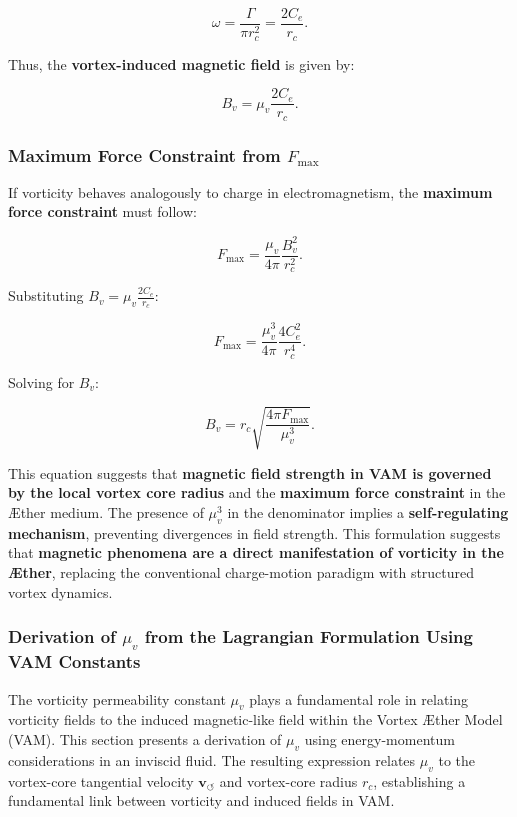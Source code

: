     \begin{equation*}
        \omega = \frac{\Gamma}{\pi r_c^2} = \frac{2 C_e}{r_c}.
    \end{equation*}

    Thus, the \textbf{vortex-induced magnetic field} is given by:

    \begin{equation*}
        B_v = \mu_v \frac{2 C_e}{r_c}.
    \end{equation*}

    \subsubsection*{Maximum Force Constraint from \( F_{\max} \)}
    If vorticity behaves analogously to charge in electromagnetism, the \textbf{maximum force constraint} must follow:

    \begin{equation*}
        F_{\max} = \frac{\mu_v}{4\pi} \frac{B_v^2}{r_c^2}.
    \end{equation*}

    Substituting \( B_v = \mu_v \frac{2 C_e}{r_c} \):

    \begin{equation*}
        F_{\max} = \frac{\mu_v^3}{4\pi} \frac{4 C_e^2}{r_c^4}.
    \end{equation*}

    Solving for \( B_v \):

    \begin{equation*}
        B_v = r_c \sqrt{\frac{4\pi F_{\max}}{\mu_v^3}}.
    \end{equation*}

    This equation suggests that \textbf{magnetic field strength in VAM is governed by the local vortex core radius} and the \textbf{maximum force constraint} in the Æther medium. The presence of \( \mu_v^3 \) in the denominator implies a \textbf{self-regulating mechanism}, preventing divergences in field strength.  This formulation suggests that \textbf{magnetic phenomena are a direct manifestation of vorticity in the Æther}, replacing the conventional charge-motion paradigm with structured vortex dynamics.

\subsubsection*{Derivation of \( \mu_v \) from the Lagrangian Formulation Using VAM Constants}
The vorticity permeability constant \( \mu_v \) plays a fundamental role in relating vorticity fields to the induced magnetic-like field within the Vortex Æther Model (VAM). This section presents a derivation of \( \mu_v \) using energy-momentum considerations in an inviscid fluid. The resulting expression relates \( \mu_v \) to the vortex-core tangential velocity \( \mathbf{v}_{\scriptscriptstyle\boldsymbol{\circlearrowleft}} \) and vortex-core radius \( r_c \), establishing a fundamental link between vorticity and induced fields in VAM.


